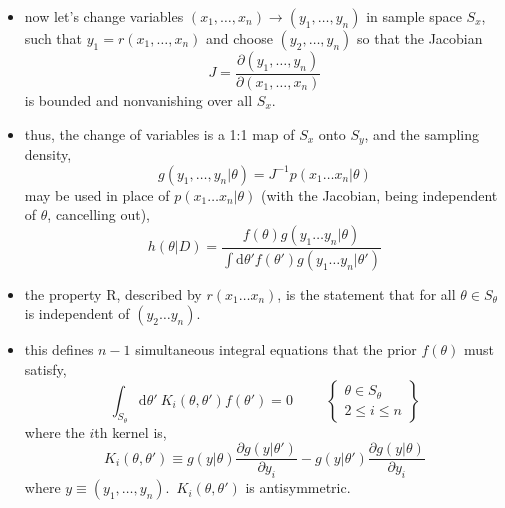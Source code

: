 \documentclass[../jaynes_prob_theory_notes.tex]{subfiles}
\begin{document}
\begin{itemize}
\begin{itemize}
                        \item now let's change variables $(x_1, \ldots, x_n) \rightarrow (y_1, \ldots, y_n)$ in sample space $S_x$, such that $y_1 = r(x_1, \ldots, x_n)$ and choose $(y_2, \ldots, y_n)$ so that the Jacobian
                            \begin{equation*}
                                J = \frac{\partial (y_1, \ldots, y_n)}{\partial (x_1, \ldots, x_n)}
                            \end{equation*}
                            is bounded and nonvanishing over all $S_x$.
                        \item thus, the change of variables is a 1:1 map of $S_x$ onto $S_y$, and the sampling density,
                            \begin{equation*}
                                g(y_1, \ldots, y_n | \theta) = J^{-1} p(x_1 \ldots x_n | \theta)
                            \end{equation*}
                            may be used in place of $p(x_1 \ldots x_n | \theta)$ (with the Jacobian, being independent of $\theta$, cancelling out),
                            \begin{equation*}
                                h(\theta | D) = \frac{f(\theta) g(y_1 \ldots y_n | \theta)}{\int \mathrm{d}{\theta}' f({\theta}') g(y_1 \ldots y_n | {\theta}')}
                            \end{equation*}
                        \item the property R, described by $r(x_1 \ldots x_n)$, is the statement that for all $\theta \in S_{\theta}$ is independent of $(y_2 \ldots y_n)$.
                        \item this defines $n-1$ simultaneous integral equations that the prior $f(\theta)$ must satisfy,
                            \begin{equation}
                                \label{kernel}
                                \int_{S_{\theta}} \mathrm{d}{\theta}'~K_{i}(\theta, {\theta}')f({\theta}') = 0 \hspace{1cm} \left \{ \begin{matrix} \theta \in S_{\theta} \\ 2 \leq i \leq n \end{matrix} \right \}
                            \end{equation}
                            where the $i$th kernel is,
                            \begin{equation*}
                                K_{i}(\theta, {\theta}') \equiv g(y|\theta) \frac{\partial g(y|{\theta}')}{\partial y_i} - g(y|{\theta}')\frac{\partial g(y|\theta)}{\partial y_i}
                            \end{equation*}
                            where $y \equiv (y_1, \ldots, y_n)$.\ $K_{i}(\theta, {\theta}')$ is antisymmetric.
                    \end{itemize}
            \end{itemize}
\end{document}
